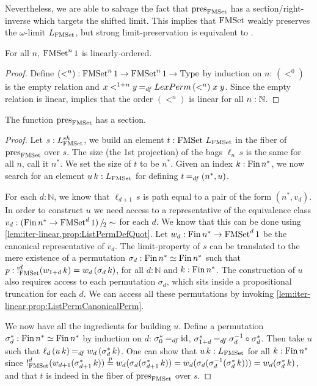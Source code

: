 \documentclass[final,a4paper,USenglish,cleveref]{lipics-v2021}
\begin{document}
Nevertheless, we are able to salvage the fact that $\pres{\FMSet}$ has a section/right-inverse which targets the shifted limit. This implies that $\FMSet$ weakly preserves the $\omega$-limit $\Lim{\FMSet}$, but strong limit-preservation is equivalent to \LLPO{}.
\begin{lemma}\label{lem:iter-linear}
For all $n$, $\FMSet^n 1$ is linearly-ordered.
\end{lemma}
\begin{proof}
Define $(<^n) : \FMSet^n 1 \to \FMSet^n 1 \to \Type$ by induction on $n$: $(<^0)$ is the empty relation and $x <^{1 + n} y \DefEq \LexPerm\,(<^n)\;x\;y$. Since the empty relation is linear,  implies that the order $(<^n)$ is linear for all $n : \mathbb{N}$.
\end{proof}

\begin{theorem}\label{thm:PresFMSetSection}
 The function $\pres{\FMSet}$ has a section.
\end{theorem}
\begin{proof}
  Let $s : \LimSh{\FMSet}$, we build an element $t : \FMSet \,\Lim{\FMSet}$ in the fiber of $\pres{\FMSet}$ over $s$. The size (\ie the 1st projection) of the bags $\ell_n\,s$ is the same for all $n$, call it $n^*$. We set the size of $t$ to be $n^*$. Given an index $k : \Fin n^*$, we now search for an element $u\,k : \Lim{\FMSet}$ for defining $t \DefEq (n^*,u)$.

  For each $d : ℕ$, we know that $\ell_{d + 1}\,s$ is path equal to a pair of the form $(n^*,v_d)$. In order to construct $u$ we need access to a representative of the equivalence class $v_d : \SetQuot[(\Fin n^* \to \FMSet^d 1)][\sim]$ for each $d$. We know that this can be done using \cref{lem:iter-linear,prop:ListPermDefQuot}. Let $w_d : \Fin n^* \to \FMSet^d 1$ be the canonical representative of $v_d$.
  The limit-property of $s$ can be translated to the mere existence of a permutation $\sigma_d : \Fin n^* \simeq \Fin n^*$
  such that $p : \Bang_{\FMSet}^d(w_{1 + d}\, k) = w_d \,(\sigma_d\,k)$, for all $d: ℕ$ and $k : \Fin n^*$. The construction of $u$ also requires access to each permutation $\sigma_d$, which sits inside a propositional truncation for each $d$. We can access all these permutations by invoking \cref{lem:iter-linear,prop:ListPermCanonicalPerm}.

  We now have all the ingredients for building $u$. Define a permutation $\sigma^*_d : \Fin n^* \simeq \Fin n^*$ by induction on $d$: $\sigma^*_0 \DefEq \Op{id}$, $\sigma^*_{1+d} \DefEq \sigma_d^{-1} \circ \sigma^*_d$. Then take $u$ such that $\ell_d \,(u\,k) \DefEq w_d\,(\sigma^*_d \,k)$. One can show that $u\,k : \Lim{\FMSet}$ for all $k : \Fin n^*$ since
  $\Bang_{\FMSet}^d (w_{d+1}(\sigma^*_{d+1}\, k)) \stackrel{p}{=} w_d (\sigma_d (\sigma^*_{d+1}\, k)) = w_d (\sigma_d (\sigma_d^{-1} (\sigma^*_d\, k))) = w_d (\sigma^*_d\, k)$,
  and that $t$ is indeed in the fiber of $\pres{\FMSet}$ over $s$.
\end{proof}
\end{document}
